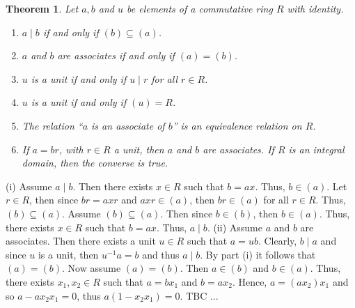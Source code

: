 \documentclass{article}
\makeatletter
\newtheorem{theorem}{Theorem}[section]
\theoremstyle{definition}
\theoremstyle{remark}
\let\oldproofname=\proofname
\renewcommand{\proofname}{\bf{\textit{\oldproofname}}}
\theoremstyle{definition}
\renewenvironment{proof}[1][\proofname]{\par
  \pushQED{\qed}%
  \normalfont \topsep6\p@\@plus6\p@\relax
  \list{}{\leftmargin=0mm
          \rightmargin=0mm
          \settowidth{\itemindent}{\itshape#1}%
          \labelwidth=4mm
          \parsep=0pt \listparindent=0mm%
  }
  \item[\hskip\labelsep
        \itshape
    #1\@addpunct{.}]\ignorespaces
}{%
  \popQED\endlist\@endpefalse
}
\makeatother
\begin{document}
    \begin{theorem}\label{thm:2.3}
        Let $a,b$ and $u$ be elements of a commutative ring $R$ with identity.
            \begin{enumerate}[label=(\roman*)]
                \item $a\mid b$ if and only if $(b)\subseteq (a)$.
                \item $a$ and $b$ are associates if and only if $(a)=(b)$.
                \item $u$ is a unit if and only if $u\mid r$ for all $r\in R$.
                \item $u$ is a unit if and only if $(u)=R$.
                \item The relation ``$a$ is an associate of $b$'' is an equivalence relation on $R$.
                \item If $a=br$, with $r\in R$ a unit, then $a$ and $b$ are associates. If $R$ is an integral domain, then the converse is true.
            \end{enumerate}
    \end{theorem}
        \begin{proof}
            (i) Assume $a\mid b$. Then there exists $x\in R$ such that $b=ax$. Thus, $b\in (a)$. Let $r\in R$, then since $br=axr$ and $axr\in(a)$, then $br\in(a)$ for all $r\in R$. Thus, $(b)\subseteq (a)$. Assume $(b)\subseteq (a)$. Then since $b\in(b)$, then $b\in(a)$. Thus, there exists $x\in R$ such that $b=ax$. Thus, $a\mid b$. (ii) Assume $a$ and $b$ are associates. Then there exists a unit $u\in R$ such that $a=ub$. Clearly, $b\mid a$ and since $u$ is a unit, then $u^{-1}a=b$ and thus $a\mid b$. By part (i) it follows that $(a)=(b)$. Now assume $(a)=(b)$. Then $a\in (b)$ and $b\in (a)$. Thus, there exists $x_1,x_2\in R$ such that $a=bx_1$ and $b=ax_2$. Hence, $a=(ax_2)x_1$ and so $a-ax_2x_1=0$, thus $a(1-x_2x_1)=0$. TBC ...
        \end{proof}
        
\end{document}

